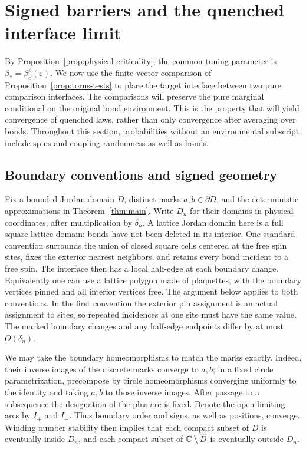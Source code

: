 \section{Signed barriers and the quenched interface limit}
\label{sec:interface}

By Proposition~\ref{prop:physical-criticality}, the common tuning parameter is
$\beta_* =\beta_c^\rho(\varepsilon)$.  We now use the finite-vector
comparison of Proposition~\ref{prop:torus-tests} to place the target
interface between two pure comparison interfaces.  The comparisons
will preserve the pure marginal conditional on the original bond
environment.  This is the property that will yield convergence of
quenched laws, rather than only convergence after averaging over bonds.
Throughout this section, probabilities without an environmental
subscript include spins and coupling randomness as well as bonds.

\subsection{Boundary conventions and signed geometry}

Fix a bounded Jordan domain $D$, distinct marks $a,b\in\partial D$,
and the deterministic approximations in Theorem~\ref{thm:main}.
Write $D_n$ for their domains in physical coordinates, after
multiplication by $\delta_n$.  A lattice Jordan domain here is a full
square-lattice domain: bonds have not been deleted in its interior.
One standard convention surrounds the union of closed square cells
centered at the free spin sites, fixes the exterior nearest neighbors,
and retains every bond incident to a free spin.  The interface then
has a local half-edge at each boundary change.  Equivalently one can
use a lattice polygon made of plaquettes, with the boundary vertices
pinned and all interior vertices free.  The argument below applies to
both conventions.  In the first convention the exterior pin assignment
is an actual assignment to sites, so repeated incidences at one site
must have the same value.  The marked boundary changes and any
half-edge endpoints differ by at most $O(\delta_n)$.

We may take the boundary homeomorphisms to match the marks exactly.
Indeed, their inverse images of the discrete marks converge to $a,b$;
in a fixed circle parametrization, precompose by circle homeomorphisms
converging uniformly to the identity and taking $a,b$ to those inverse
images.  After passage to a subsequence the designation of the plus
arc is fixed.  Denote the open limiting arcs by $I_+$ and $I_-$.
Thus boundary order and signs, as well as positions, converge.
Winding number stability then implies that each compact subset of $D$
is eventually inside $D_n$, and each compact subset of
$\mathbb C\setminus\overline D$ is eventually outside $D_n$.

